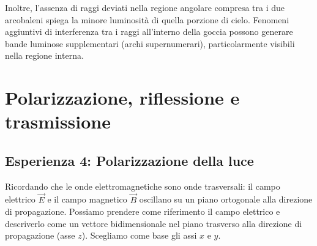 \documentclass[openany,a4paper,12pt]{book}
\begin{document}
\begin{center}
\end{center}

Inoltre, l'assenza di raggi deviati nella regione angolare compresa tra i due arcobaleni spiega la minore luminosità di quella porzione di cielo. 
Fenomeni aggiuntivi di interferenza tra i raggi all'interno della goccia possono generare bande luminose supplementari (archi supernumerari), particolarmente visibili nella regione interna.


\chapter{Polarizzazione, riflessione e trasmissione}

\section{Esperienza 4: Polarizzazione della luce}

Ricordando che le onde elettromagnetiche sono onde trasversali: il campo elettrico $\vec{E}$ e il campo magnetico $\vec{B}$ oscillano su un piano ortogonale alla direzione di propagazione. Possiamo prendere come riferimento il campo elettrico e descriverlo come un vettore bidimensionale nel piano trasverso alla direzione di propagazione (asse $z$). Scegliamo come base gli assi $x$ e $y$.
\end{document}
